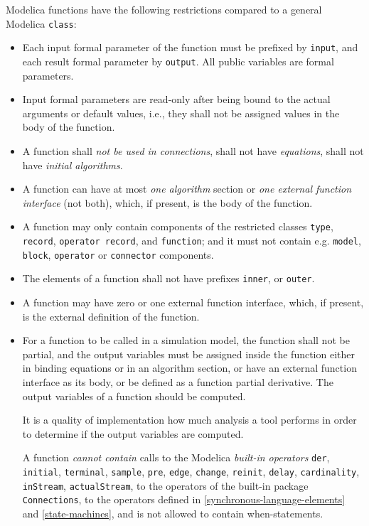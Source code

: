 Modelica functions have the following restrictions compared to a general
Modelica \lstinline!class!:
\begin{itemize}
\item
  Each input formal parameter of the function must be prefixed by \lstinline!input!, and each result formal parameter by \lstinline!output!.
  All public variables are formal parameters.
\item
  Input formal parameters are read-only after being bound to the actual
  arguments or default values, i.e., they shall not be assigned values in
  the body of the function.
\item
  A function shall \emph{not be used in connections}, shall not have
  \emph{equations}, shall not have \emph{initial algorithms}.
\item
  A function can have at most \emph{one algorithm} section or \emph{one
  external function interface} (not both), which, if present, is the
  body of the function.
\item
  A function may only contain components of the restricted classes
  \lstinline!type!, \lstinline!record!, \lstinline!operator record!, and \lstinline!function!;
  and it must not contain e.g.
  \lstinline!model!, \lstinline!block!, \lstinline!operator! or \lstinline!connector!
  components.
\item
  The elements of a function shall not have prefixes \lstinline!inner!, or \lstinline!outer!.
\item
  A function may have zero or one external function interface, which, if
  present, is the external definition of the function.
\item
  For a function to be called in a simulation model, the function shall
  not be partial, and the output variables must be assigned inside the
  function either in binding equations or in an algorithm section,
  or have an external function interface as its body, or be defined as a
  function partial derivative. The output variables of a function should
  be computed.
  \begin{nonnormative}
  It is a quality of implementation how much analysis a tool performs in order to determine if the output variables are computed.
  \end{nonnormative}
  A function \emph{cannot contain} calls to the Modelica \emph{built-in operators} \lstinline!der!, \lstinline!initial!, \lstinline!terminal!, \lstinline!sample!, \lstinline!pre!, \lstinline!edge!, \lstinline!change!, \lstinline!reinit!, \lstinline!delay!, \lstinline!cardinality!, \lstinline!inStream!, \lstinline!actualStream!, to the operators of the built-in package \lstinline!Connections!, to the operators defined in \cref{synchronous-language-elements} and \cref{state-machines}, and is not allowed to contain when-statements.

\end{itemize}
